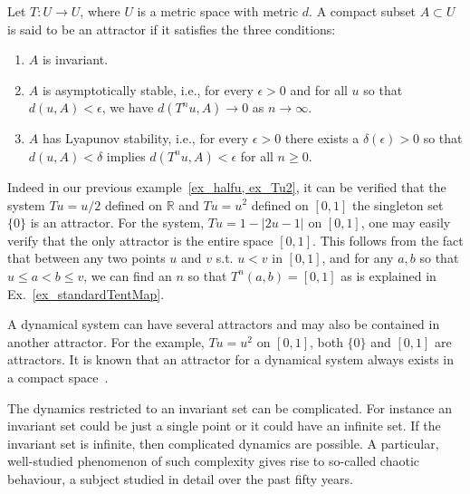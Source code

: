 \begin{Definition}
  [\bf Attractor]\label{Dfn_Attractor}\rm
  Let $T: U \to U$, where $U$  is a metric space with metric $d$. A compact subset $A \subset U$ is said to be an attractor if it satisfies the three conditions: 
  \vspace{-8mm}
  \begin{enumerate}
	\item $A$ is invariant. 
	\item $A$ is asymptotically stable, i.e., for every $\epsilon > 0$ and for all $u$ so that $d(u,A) < \epsilon$, we have $d(T^nu,A){\to}{0}$ as $n\to \infty$. 
	\item $A$ has Lyapunov stability, i.e., for every $\epsilon > 0$  there exists a $\delta(\epsilon) > 0$ so that $d(u,A) < \delta$ implies $d(T^nu,A) < \epsilon$ for all $n\ge 0$.  
\end{enumerate}
\end{Definition} 

Indeed in our previous example~\ref{ex_halfu, ex_Tu2}, it can be verified that the system  $Tu=u/2$ defined on  $\mathbb{R}$ and $Tu=u^2$ defined on $[0,1]$  the singleton set $\{0\}$ is an attractor.  For the system,  $Tu=1-|2u-1|$ on $[0,1]$, one may easily verify that the only attractor is the entire space $[0,1]$. This follows from the fact that between any two points $u$ and $v$ s.t. $u< v$ in $[0,1]$, and for any $a,b$ so that $u\le a < b \le v$, we can find an $n$ so that $T^n(a,b)=[0,1]$  as is explained in Ex.~\ref{ex_standardTentMap}. 

A dynamical system can have several attractors and may also be contained in another attractor. For the example, $Tu =u^2$ on $[0,1]$, both $\{0\}$ and $[0,1]$ are attractors. It is known that an attractor for a dynamical system always exists in a compact space~\cite{Milnor1985}.

The dynamics restricted to an invariant set can be complicated. For instance an invariant set could be just a single point or it could have an infinite set. If the invariant set is infinite, then complicated dynamics are possible. A particular, well-studied phenomenon of such complexity gives rise to so-called chaotic behaviour, a subject studied in detail over the past fifty years.



